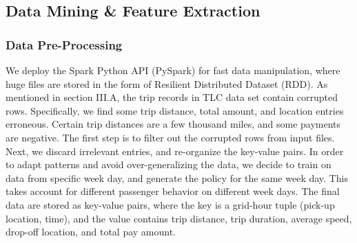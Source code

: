\documentclass[letterpaper, 10 pt, conference]{ieeeconf}
\begin{document}
\subsection{Data Mining \& Feature Extraction}
\subsubsection{Data Pre-Processing}
We deploy the Spark Python API (PySpark) for fast data manipulation, where huge files are stored in the form of Resilient Distributed Dataset (RDD). As mentioned in section III.A, the trip records in TLC data set contain corrupted rows. Specifically, we find some trip distance, total amount, and location entries erroneous. Certain trip distances are a few thousand miles, and some payments are negative. The first step is to filter out the corrupted rows from input files. Next, we discard irrelevant entries, and re-organize the key-value pairs. In order to adapt patterns and avoid over-generalizing the data, we decide to train on data from specific week day, and generate the policy for the same week day. This takes account for different passenger behavior on different week days. The final data are stored as key-value pairs, where the key is a grid-hour tuple (pick-up location, time), and the value contains trip distance, trip duration, average speed, drop-off location, and total pay amount.
\end{document}
